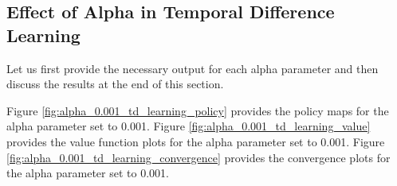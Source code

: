 \documentclass{assignment}
\begin{document}
\subsection{Effect of Alpha in Temporal Difference Learning}
Let us first provide the necessary output for each alpha parameter and then discuss the results at the end of this section.

Figure \ref{fig:alpha_0.001_td_learning_policy} provides the policy maps for the alpha parameter set to 0.001. Figure \ref{fig:alpha_0.001_td_learning_value} provides the value function plots for the alpha parameter set to 0.001. Figure \ref{fig:alpha_0.001_td_learning_convergence} provides the convergence plots for the alpha parameter set to 0.001.
\end{document}
